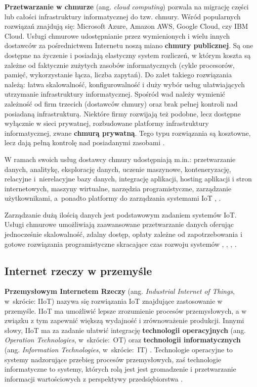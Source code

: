 \documentclass[a4paper, 12pt, twoside]{article}
\begin{document}
\textbf{Przetwarzanie w chmurze} (ang. \emph{cloud computing}) pozwala
na migrację części lub całości infrastruktury informatycznej do tzw. chmury.
Wśród popularnych rozwiązań znajdują się:
Microsoft Azure, Amazon AWS, Google Cloud, czy IBM Cloud. Usługi chmurowe
udostępnianie przez wymienionych i wielu innych dostawców za pośrednictwem Internetu
noszą miano \textbf{chmury publicznej}.
Są one dostępne na życzenie i posiadają elastyczny
system rozliczeń, w którym koszta są zależne od faktycznie zużytych zasobów informatycznych
(cykle procesorów, pamięć, wykorzystanie łącza, liczba zapytań). Do zalet takiego
rozwiązania należą: łatwa skalowalność, konfigurowalność i duży wybór usług
ułatwiających utrzymanie infrastruktury informatycznej. Spośród wad należy wymienić
zależność od firm trzecich (dostawców chmury) oraz brak pełnej kontroli nad
posiadaną infrastrukturą. Niektóre firmy rozwijają też podobne, lecz dostępne
wyłącznie w sieci prywatnej, rozbudowane platformy infrastruktury informatycznej, zwane \textbf{chmurą prywatną}.
Tego typu rozwiązania są kosztowne, lecz dają pełną kontrolę nad posiadanymi zasobami \cite{iot-hype-to-reality}.

W ramach swoich usług dostawcy chmury udostępniają m.in.: przetwarzanie danych,
analitykę, eksplorację danych, uczenie maszynowe, konteneryzację, relacyjne i~nierelacyjne
bazy danych, integrację aplikacji, hosting aplikacji i stron internetowych,
maszyny wirtualne, narzędzia programistyczne, zarządzanie użytkownikami, a~ponadto
platformy do zarządzania systemami IoT \cite{aws}, \cite{azure}.

Zarządzanie dużą ilością danych jest podstawowym zadaniem systemów IoT.
Usługi chmurowe umożliwiają zaawansowane przetwarzanie danych
oferując jednocześnie skalowalność, zdalny dostęp, opłaty zależne od zapotrzebowania
i gotowe rozwiązania programistyczne skracające czas rozwoju systemów
\cite{intro-to-iot}, \cite{measuring-value-of-cloud-computing}, \cite{iot-and-cloud}, \cite{iot-in-industrial-sector}.

\subsection{Internet rzeczy w przemyśle}\label{iiot}

\textbf{Przemysłowym Internetem Rzeczy} (ang. \emph{Industrial Internet of Things}, w~skrócie: IIoT)
nazywa się rozwiązania IoT znajdujące zastosowanie w przemyśle.
IIoT ma umożliwić lepsze zrozumienie procesów
przemysłowych, a w związku z tym zapewnić większą wydajność i zrównoważenie
produkcji. Innymi słowy, IIoT ma za zadanie ułatwić integrację \textbf{technologii operacyjnych}
(ang. \emph{Operation Technologies}, w~skrócie:~OT) oraz
\textbf{technologii informatycznych} (ang. \emph{Information Technologies}, w~skrócie:~IT)
\cite{iiot-challenges-opportunities-directions}.
Technologie operacyjne to systemy nadzorujące przebieg procesów przemysłowych,
zaś technologie informatyczne to systemy, których rolą jest jest gromadzenie
i przetwarzanie informacji wartościowych z perspektywy przedsiębiorstwa
\cite{ot-it-categorization-of-customer-concerns}.
\end{document}
